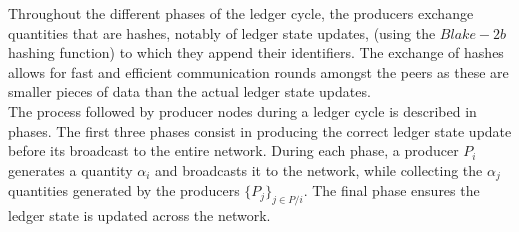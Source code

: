 Throughout the different phases of the ledger cycle, the producers exchange quantities that are hashes, notably of ledger state updates, (using the $Blake-2b$ hashing function) to which they append their identifiers. The exchange of hashes allows for fast and efficient communication rounds amongst the peers as these are smaller pieces of data than the actual ledger state updates. \\

The process followed by producer nodes during a ledger cycle is described in phases. The first three phases consist in producing the correct ledger state update before its broadcast to the entire network. During each phase, a producer $P_i$ generates a quantity $\alpha_i$ and broadcasts it to the network, while collecting the $\alpha_j$ quantities generated by the producers $\{P_j\}_{j\in P/i}$. The final phase ensures the ledger state is updated  across the network. 


